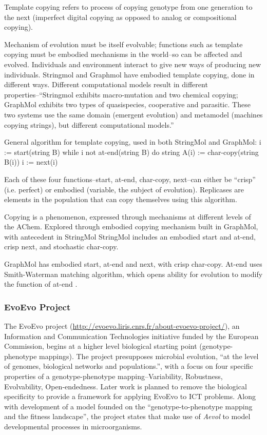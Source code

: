 Template copying refers to process of copying genotype from one generation to the next (imperfect digital copying as opposed to analog or compositional copying).

Mechanism of evolution must be itself evolvable; functions such as template copying must be embodied mechanisms in the world--so can be affected and evolved.
Individuals and environment interact to give new ways of producing new individuals.
Stringmol and Graphmol have embodied template copying, done in different ways. Different computational models result in different properties--``Stringmol exhibits macro-mutation and two chemical copying; GraphMol exhibits two types of quasispecies, cooperative and parasitic. These two systems use the same domain (emergent evolution) and metamodel (machines copying strings), but different computational models.''

General algorithm for template copying, used in both StringMol and GraphMol: \cite{Nellis2014}
i := start(string B)
while i not at-end(string B) do
string A(i) := char-copy(string B(i))
i := next(i)

Each of these four functions--start, at-end, char-copy, next--can either be ``crisp'' (i.e. perfect) or embodied (variable, the subject of evolution). Replicases are elements in the population that can copy themselves using this algorithm.

Copying is a phenomenon, expressed through mechanisms at different levels of the AChem. Explored through embodied copying mechanism built in GraphMol, with antecedent in StringMol \parencite{Hickinbotham2011}
StringMol includes an embodied start and at-end, crisp next, and stochastic char-copy. 

GraphMol has embodied start, at-end and next, with crisp char-copy. At-end uses Smith-Waterman matching algorithm, which opens ability for evolution to modify the function of at-end \parencite[p.143]{Nellis2012}. 

\subsubsection{EvoEvo Project}
The EvoEvo project (\url{http://evoevo.liris.cnrs.fr/about-evoevo-project/}), an Information and Communication Technologies initiative funded by the European Commission, begins at a higher level biological starting point (genotype-phenotype mappings). The project presupposes microbial evolution, ``at the level of genomes, biological networks and populations.'', with a focus on four specific properties of a genotype-phenotype mapping--Variability, Robustness, Evolvability, Open-endedness. Later work is planned to remove the biological specificity to provide a framework for applying EvoEvo to ICT problems. Along with development of a model founded on the ``genotype-to-phenotype mapping and the fitness landscape'', the project states that make use of \emph{Aevol} \parencite{Knibbe:2006vn,Knibbe:2007kx} to model developmental processes in microorganisms.

